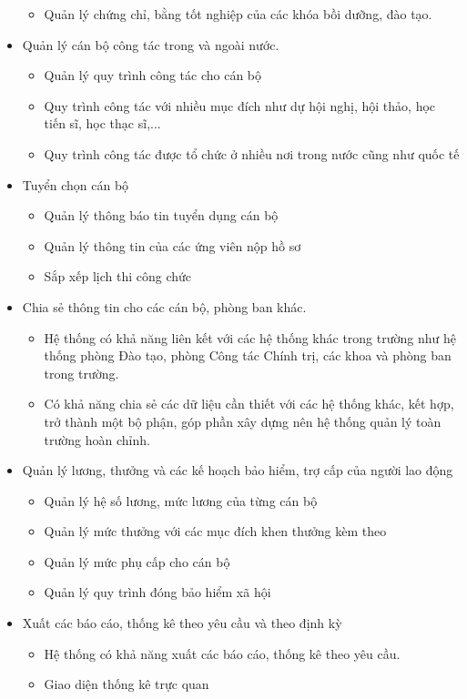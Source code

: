 \begin{itemize}
\begin{itemize}
        \item Quản lý chứng chỉ, bằng tốt nghiệp của các khóa bồi dưỡng, đào tạo.
    \end{itemize}
    \item Quản lý cán bộ công tác trong và ngoài nước.
    \begin{itemize}
        \item Quản lý quy trình công tác cho cán bộ
        \item Quy trình công tác với nhiều mục đích như dự hội nghị, hội thảo, học tiến sĩ, học thạc sĩ,...
        \item Quy trình công tác được tổ chức ở nhiều nơi trong nước cũng như quốc tế
    \end{itemize}
    \item Tuyển chọn cán bộ
    \begin{itemize}
        \item Quản lý thông báo tin tuyển dụng cán bộ
        \item Quản lý thông tin của các ứng viên nộp hồ sơ
        \item Sắp xếp lịch thi công chức
    \end{itemize}
    \item Chia sẻ thông tin cho các cán bộ, phòng ban khác.
    \begin{itemize}
        \item Hệ thống có khả năng liên kết với các hệ thống khác trong trường như hệ thống phòng Đào tạo, phòng Công tác Chính trị, các khoa và phòng ban trong trường.
        \item Có khả năng chia sẻ các dữ liệu cần thiết với các hệ thống khác, kết hợp, trở thành một bộ phận, góp phần xây dựng nên hệ thống quản lý toàn trường hoàn chỉnh.
    \end{itemize}
    \item Quản lý lương, thưởng và các kế hoạch bảo hiểm, trợ cấp của người lao động
    \begin{itemize}
        \item Quản lý hệ số lương, mức lương của từng cán bộ
        \item Quản lý mức thưởng với các mục đích khen thưởng kèm theo
        \item Quản lý mức phụ cấp cho cán bộ
        \item Quản lý quy trình đóng bảo hiểm xã hội
    \end{itemize}
    \item Xuất các báo cáo, thống kê theo yêu cầu và theo định kỳ
    \begin{itemize}
        \item Hệ thống có khả năng xuất các báo cáo, thống kê theo yêu cầu.
        \item Giao diện thống kê trực quan
    \end{itemize}
\end{itemize}
